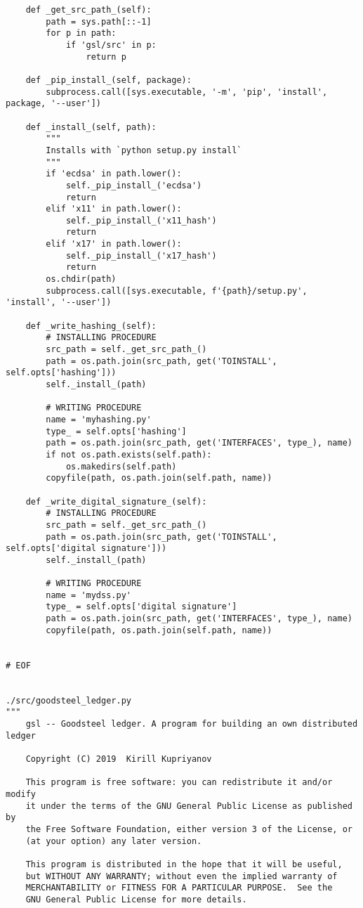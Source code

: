 \begin{lstlisting}
    def _get_src_path_(self):
        path = sys.path[::-1]
        for p in path:
            if 'gsl/src' in p:
                return p

    def _pip_install_(self, package):
        subprocess.call([sys.executable, '-m', 'pip', 'install', package, '--user'])

    def _install_(self, path):
        """
        Installs with `python setup.py install`
        """
        if 'ecdsa' in path.lower():
            self._pip_install_('ecdsa')
            return
        elif 'x11' in path.lower():
            self._pip_install_('x11_hash')
            return
        elif 'x17' in path.lower():
            self._pip_install_('x17_hash')
            return
        os.chdir(path)
        subprocess.call([sys.executable, f'{path}/setup.py', 'install', '--user'])

    def _write_hashing_(self):
        # INSTALLING PROCEDURE
        src_path = self._get_src_path_()
        path = os.path.join(src_path, get('TOINSTALL', self.opts['hashing']))
        self._install_(path)

        # WRITING PROCEDURE
        name = 'myhashing.py'
        type_ = self.opts['hashing']
        path = os.path.join(src_path, get('INTERFACES', type_), name)
        if not os.path.exists(self.path):
            os.makedirs(self.path)
        copyfile(path, os.path.join(self.path, name))

    def _write_digital_signature_(self):
        # INSTALLING PROCEDURE
        src_path = self._get_src_path_()
        path = os.path.join(src_path, get('TOINSTALL', self.opts['digital signature']))
        self._install_(path)

        # WRITING PROCEDURE
        name = 'mydss.py'
        type_ = self.opts['digital signature']
        path = os.path.join(src_path, get('INTERFACES', type_), name)
        copyfile(path, os.path.join(self.path, name))


# EOF


./src/goodsteel_ledger.py
"""
    gsl -- Goodsteel ledger. A program for building an own distributed ledger

    Copyright (C) 2019  Kirill Kupriyanov

    This program is free software: you can redistribute it and/or modify
    it under the terms of the GNU General Public License as published by
    the Free Software Foundation, either version 3 of the License, or
    (at your option) any later version.

    This program is distributed in the hope that it will be useful,
    but WITHOUT ANY WARRANTY; without even the implied warranty of
    MERCHANTABILITY or FITNESS FOR A PARTICULAR PURPOSE.  See the
    GNU General Public License for more details.


\end{lstlisting}
